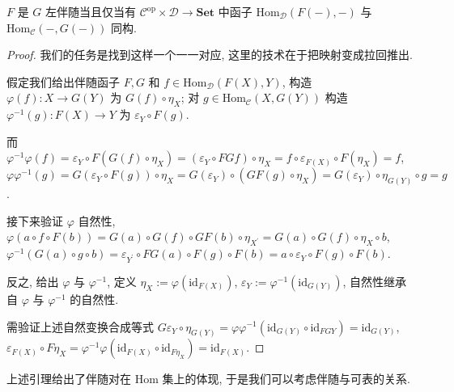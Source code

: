 \begin{lemma}
    \(F\) 是 \(G\) 左伴随当且仅当有 \(\mathcal{C}^{\mathrm{op}} \times \mathcal{D} \to \mathbf{Set}\) 中函子
    \(\mathrm{Hom}_{\mathcal{D}} (F (-), -)\) 与 \(\mathrm{Hom}_{\mathcal{C}} (-, G (-))\) 同构.

    \begin{proof}
        我们的任务是找到这样一个一一对应, 这里的技术在于把映射变成拉回推出.

        假定我们给出伴随函子 \(F,G\) 和 \(f \in \mathrm{Hom}_{\mathcal{D}} (F (X), Y)\), 构造
        \(\varphi(f) : X \to G (Y)\) 为 \(G (f) \circ \eta_X\); 对 \(g \in \mathrm{Hom}_{\mathcal{C}} (X, G(Y))\) 构造
        \(\varphi^{-1} (g) : F(X) \to Y\) 为 \(\varepsilon_Y \circ F (g)\).

        而 \(\varphi^{-1} \varphi (f) = \varepsilon_{Y} \circ F (G (f) \circ \eta_X) = (\varepsilon_Y \circ FG f) \circ \eta_X = f \circ \varepsilon_{F(X)} \circ F (\eta_X) = f\),
        \(\varphi \varphi^{-1} (g) = G(\varepsilon_Y \circ F(g)) \circ \eta_X = G (\varepsilon_Y) \circ (GF (g) \circ \eta_{X}) = G (\varepsilon_Y) \circ \eta_{G(Y)} \circ g = g\).

        接下来验证 \(\varphi\) 自然性, \(\varphi(a \circ f \circ F(b)) = G(a) \circ G(f) \circ GF (b) \circ \eta_{X^\prime} = G(a) \circ G(f) \circ \eta_X \circ b\),
        \(\varphi^{-1} (G(a) \circ g \circ b) = \varepsilon_{Y^\prime} \circ FG(a) \circ F(g) \circ F(b) = a \circ \varepsilon_Y \circ F(g) \circ F(b)\).

        反之, 给出 \(\varphi\) 与 \(\varphi^{-1}\), 定义 \(\eta_X := \varphi (\mathrm{id}_{F(X)})\), \(\varepsilon_Y := \varphi^{-1} (\mathrm{id}_{G(Y)})\),
        自然性继承自 \(\varphi\) 与 \(\varphi^{-1}\) 的自然性.

        需验证上述自然变换合成等式 \(G \varepsilon_Y \circ \eta_{G(Y)} = \varphi \varphi^{-1} (\mathrm{id}_{G(Y)} \circ \mathrm{id}_{FGY}) = \mathrm{id}_{G(Y)}\),
        \(\varepsilon_{F(X)} \circ F \eta_X = \varphi^{-1} \varphi (\mathrm{id}_{F(X)} \circ \mathrm{id}_{F \eta_X}) = \mathrm{id}_{F(X)}\).
    \end{proof}
\end{lemma}

上述引理给出了伴随对在 \(\mathrm{Hom}\) 集上的体现, 于是我们可以考虑伴随与可表的关系.

